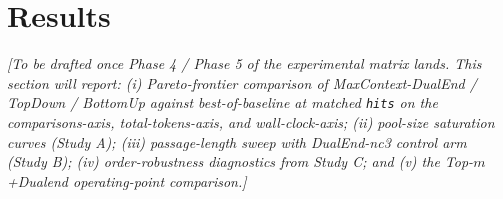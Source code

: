 \section{Results}
\label{sec:results}

\textit{[To be drafted once Phase 4 / Phase 5 of the experimental matrix lands.
This section will report: (i) Pareto-frontier comparison of MaxContext-DualEnd /
TopDown / BottomUp against best-of-baseline at matched \texttt{hits} on the
comparisons-axis, total-tokens-axis, and wall-clock-axis; (ii) pool-size
saturation curves (Study A); (iii) passage-length sweep with DualEnd-nc3
control arm (Study B); (iv) order-robustness diagnostics from Study C; and (v)
the Top-$m$+Dualend operating-point comparison.]}
